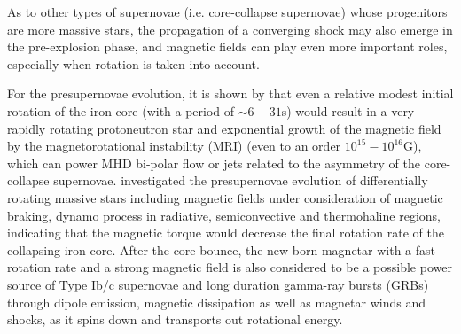\documentclass[fleqn,usenatbib]{mnras}
\begin{document}

As to other types of supernovae (i.e. core-collapse supernovae) whose progenitors are more massive stars, the propagation of a converging shock may also emerge in the pre-explosion phase, and magnetic fields can play even more important roles, especially when rotation is taken into account. 

For the presupernovae evolution, it is shown by \citet{akiyama2004magnetic} that even a relative modest initial rotation of the iron core (with a period of $\sim 6-31$s) would result in a very rapidly rotating protoneutron star and exponential growth of the magnetic field by the magnetorotational instability (MRI) (even to an order $10^{15}-10^{16}$G), which can power MHD bi-polar flow or jets related to the asymmetry of the core-collapse supernovae. \citet{heger2005presupernova} investigated the presupernovae evolution of differentially rotating massive stars including magnetic fields under consideration of magnetic braking, dynamo process in radiative, semiconvective and thermohaline regions, indicating that the magnetic torque would decrease the final rotation rate of the collapsing iron core. After the core bounce, the new born magnetar with a fast rotation rate and a strong magnetic field is also considered to be a possible power source of Type Ib/c supernovae \citep{Woosley2010,SNIc2013} and long duration gamma-ray bursts (GRBs) \citep{Metzger2011} through dipole emission, magnetic dissipation as well as magnetar winds and shocks, as it spins down and transports out rotational energy. 
\end{document}
